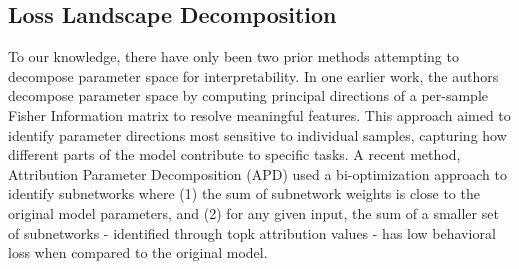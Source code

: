 \documentclass{article}
\theoremstyle{plain}
\theoremstyle{definition}
\theoremstyle{remark}
\begin{document}
\subsection{Loss Landscape Decomposition}



To our knowledge, there have only been two prior methods attempting to decompose parameter space for interpretability. In one earlier work\cite{matena2023npeff}, the authors decompose parameter space by computing principal directions of a per-sample Fisher Information matrix to resolve meaningful features. This approach aimed to identify parameter directions most sensitive to individual samples, capturing how different parts of the model contribute to specific tasks. A recent method, Attribution Parameter Decomposition (APD) \cite{braun2025interpretability} used a bi-optimization approach to identify subnetworks where (1) the sum of subnetwork weights is close to the original model parameters, and (2) for any given input, the sum of a smaller set of subnetworks - identified through topk attribution values - has low behavioral loss when compared to the original model.  

\end{document}
